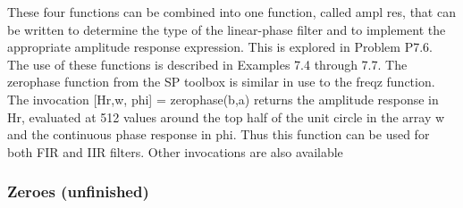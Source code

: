 \documentclass{article}
\begin{document}
These four functions can be combined into one function, called
ampl res, that can be written to determine the type of the linear-phase
filter and to implement the appropriate amplitude response expression.
This is explored in Problem P7.6. The use of these functions is described
in Examples 7.4 through 7.7.
The zerophase function from the SP toolbox is similar in use to the
freqz function. The invocation [Hr,w, phi] = zerophase(b,a) returns
the amplitude response in Hr, evaluated at 512 values around the top half
of the unit circle in the array w and the continuous phase response in
phi. Thus this function can be used for both FIR and IIR filters. Other
invocations are also available

\subsubsection{Zeroes (unfinished)}




















\newpage
\end{document}
